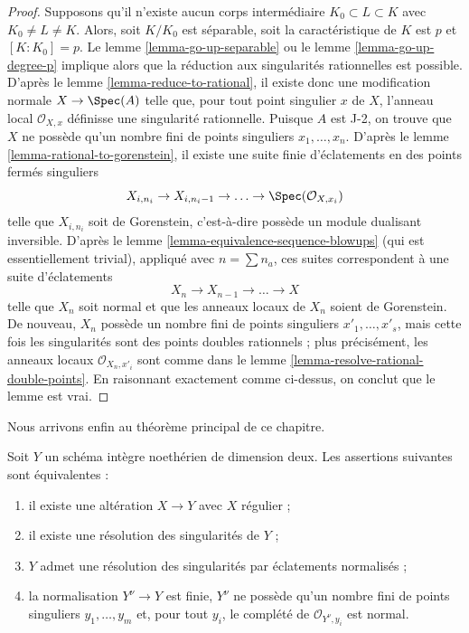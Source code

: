 \begin{proof}
\medskip\noindent Supposons qu'il n'existe aucun corps intermédiaire $K_0 \subset L \subset K$ avec $K_0 \not = L \not = K$. Alors, soit $K/K_0$ est séparable, soit la caractéristique de $K$ est $p$ et $[K : K_0] = p$. Le lemme \ref{lemma-go-up-separable} ou le lemme \ref{lemma-go-up-degree-p} implique alors que la réduction aux singularités rationnelles est possible. D'après le lemme \ref{lemma-reduce-to-rational}, il existe donc une modification normale $X \to \Spec(A)$ telle que, pour tout point singulier $x$ de $X$, l'anneau local $\mathcal{O}_{X, x}$ définisse une singularité rationnelle. Puisque $A$ est J-2, on trouve que $X$ ne possède qu'un nombre fini de points singuliers $x_1, \ldots, x_n$. D'après le lemme \ref{lemma-rational-to-gorenstein}, il existe une suite finie d'éclatements en des points fermés singuliers $$
X_{i, n_i} \to X_{i, n_i - 1} \to \ldots \to \Spec(\mathcal{O}_{X, x_i})
$$ telle que $X_{i, n_i}$ soit de Gorenstein, c'est-à-dire possède un module dualisant inversible. D'après le lemme \ref{lemma-equivalence-sequence-blowups} (qui est essentiellement trivial), appliqué avec $n = \sum n_a$, ces suites correspondent à une suite d'éclatements $$
X_n \to X_{n - 1} \to \ldots \to X
$$ telle que $X_n$ soit normal et que les anneaux locaux de $X_n$ soient de Gorenstein. De nouveau, $X_n$ possède un nombre fini de points singuliers $x'_1, \ldots, x'_s$, mais cette fois les singularités sont des points doubles rationnels ; plus précisément, les anneaux locaux $\mathcal{O}_{X_n, x'_i}$ sont comme dans le lemme \ref{lemma-resolve-rational-double-points}. En raisonnant exactement comme ci-dessus, on conclut que le lemme est vrai. \end{proof}

\noindent Nous arrivons enfin au théorème principal de ce chapitre.

\begin{theorem}[Lipman]
\label{theorem-resolve}
\begin{reference}
\cite[Théorème, page 151]{Lipman}
\end{reference}
Soit $Y$ un schéma intègre noethérien de dimension deux. Les assertions suivantes sont équivalentes :
\begin{enumerate}
\item il existe une altération $X \to Y$ avec $X$ régulier ;
\item il existe une résolution des singularités de $Y$ ;
\item $Y$ admet une résolution des singularités par éclatements normalisés ;
\item la normalisation $Y^\nu \to Y$ est finie, $Y^\nu$ ne possède qu'un nombre fini de points singuliers $y_1, \ldots, y_m$ et, pour tout $y_i$, le complété de $\mathcal{O}_{Y^\nu, y_i}$ est normal.
\end{enumerate}
\end{theorem}

